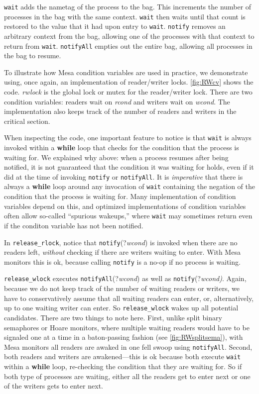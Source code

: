 \documentclass{report}
\begin{document}
\texttt{wait} adds the nametag of the process to the bag.  This increments the number of processes
in the bag with the same context.  \texttt{wait} then waits until that count is restored to the
value that it had upon entry to \texttt{wait}.  \texttt{notify} removes an arbitrary context from
the bag, allowing one of the processes with that context to return from \texttt{wait}.
\texttt{notifyAll} empties out the entire bag, allowing all processes in the bag to resume.

To illustrate how Mesa condition variables are used in practice, we demonstrate using,
once again, an implementation of reader/writer locks.
\autoref{fig:RWcv} shows the code.  \textit{rwlock} is the global lock or mutex for the
reader/writer lock.  There are two condition variables: readers wait on \textit{rcond} and
writers wait on \textit{wcond}.  The implementation also keeps track of the number of
readers and writers in the critical section.

When inspecting the code, one important feature to notice is that \texttt{wait} is always
invoked within a \textbf{while} loop that checks for the condition that the process is
waiting for.  We explained why above: when a process resumes after
being notified, it is not guaranteed that the condition it was waiting for holds, even
if it did at the time of invoking \texttt{notify} or \texttt{notifyAll}.
It is \emph{imperative} that there is always a \textbf{while} loop around any invocation
of \texttt{wait} containing the negation of the condition that the process is waiting for.
Many implementation of condition variables depend on this, and optimized implementations
of condition variables often allow so-called ``spurious wakeups,'' where \texttt{wait}
may sometimes return even if the conditon variable has not been notified.

In \texttt{release\_rlock}, notice that \texttt{notify}(?\textit{wcond}) is invoked when there
are no readers left, \emph{without} checking if there are writers waiting to enter.
With Mesa monitors this is ok, because calling \texttt{notify} is a no-op if no process
is waiting.

\texttt{release\_wlock} executes \texttt{notifyAll}(?\textit{wcond}) as well as
\texttt{notify}(?\textit{wcond)}.
Again, because we do not keep track of the number of waiting readers or writers, we
have to conservatively assume that all waiting readers can enter, or, alternatively,
up to one waiting writer can enter.  So \texttt{release\_wlock} wakes up all
potential candidates.
There are two things to note here.  First, unlike split binary semaphores or Hoare
monitors, where multiple waiting readers would have to be signaled one at a time in a
baton-passing fashion (see \autoref{fig:RWsplitsema}), with Mesa monitors
all readers are awaked in one fell swoop using \texttt{notifyAll}.
Second, both readers and writers are awakened---this is ok because both execute
\texttt{wait} within a \textbf{while} loop, re-checking the condition that they
are waiting for.  So if both type of processes are waiting, either all the readers
get to enter next or one of the writers gets to enter next.
\end{document}
